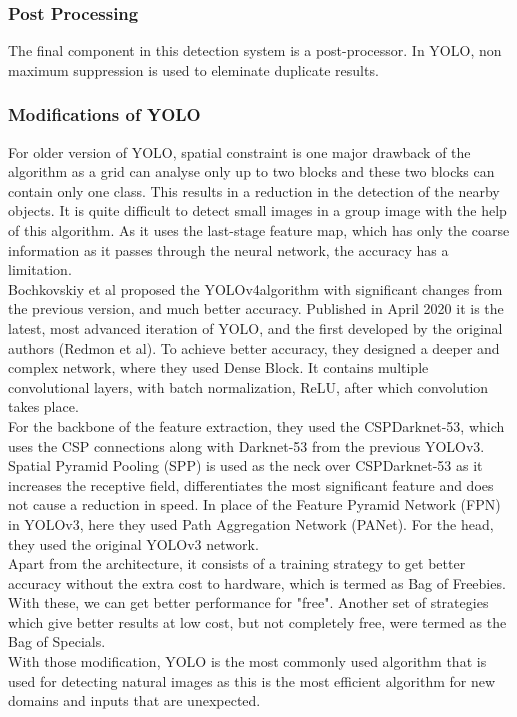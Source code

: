         \subsubsection{Post Processing}
            The final component in this detection system is a post-processor. In YOLO, non maximum suppression is used to eleminate duplicate results.

        \subsubsection{Modifications of YOLO}
            For older version of YOLO, spatial constraint is one major drawback of the algorithm as a grid can analyse only up to two blocks and these two blocks can contain only one class. This results in a reduction in the detection of the nearby objects. It is quite difficult to detect small images in a group image with the help of this algorithm. As it uses the last-stage feature map, which has only the coarse information as it passes through the neural network, the accuracy has a limitation. \\
            \vspace{3mm}
            Bochkovskiy et al proposed the YOLOv4algorithm with significant changes from the previous version, and much better accuracy. Published in April 2020 it is the latest, most advanced iteration of YOLO, and the first developed by the original authors (Redmon et al). To achieve better accuracy, they designed a deeper and complex network, where they used Dense Block. It contains multiple convolutional layers, with batch normalization, ReLU, after which convolution takes place. \\
            \vspace{3mm}
            For the backbone of the feature extraction, they used the CSPDarknet-53, which uses the CSP connections along with Darknet-53 from the previous YOLOv3. Spatial Pyramid Pooling (SPP) is used as the neck over CSPDarknet-53 as it increases the receptive field, differentiates the most significant feature and does not cause a reduction in speed. In place of the Feature Pyramid Network (FPN) in YOLOv3, here they used Path Aggregation Network (PANet). For the head, they used the original YOLOv3 network. \\ 
            \vspace{3mm}
            Apart from the architecture, it consists of a training strategy to get better accuracy without the extra cost to hardware, which is termed as Bag of Freebies. With these, we can get better performance for "free". Another set of strategies which give better results at low cost, but not completely free, were termed as the Bag of Specials. \\ 
            \vspace{3mm}
            With those modification, YOLO is the most commonly used algorithm that is used for detecting natural images as this is the most efficient algorithm for new domains and inputs that are unexpected.
        
